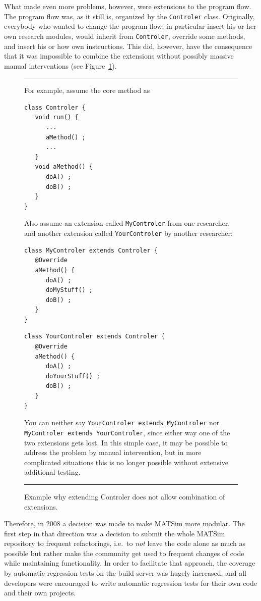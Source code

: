 What made even more problems, however, were extensions to the program flow.  The program flow was, as it still is, organized by the \lstinline$Controler$ class.  Originally, everybody who wanted to change the program flow, in particular insert his or her own research modules, would inherit from \lstinline$Controler$, override some methods, and insert his or how own instructions.  This did, however, have the consequence that it was impossible to combine the extensions without possibly massive manual interventions (see Figure~\ref{fig:do-not-extend-controler}).

\begin{figure}\footnotesize
\hrule
For example, assume the core method as
\begin{lstlisting}
class Controler {
   void run() {
      ...
      aMethod() ;
      ...
   }
   void aMethod() {
      doA() ;
      doB() ;
   }
}
\end{lstlisting}
Also assume an extension called \protect\lstinline$MyControler$
from one researcher, and another extension called \protect\lstinline$YourControler$ by another researcher:
\begin{lstlisting}
class MyControler extends Controler {
   @Override
   aMethod() {
      doA() ;
      doMyStuff() ;
      doB() ;
   }
}
\end{lstlisting}
\begin{lstlisting}
class YourControler extends Controler {
   @Override
   aMethod() {
      doA() ;
      doYourStuff() ;
      doB() ;
   }
}  
\end{lstlisting}
You can neither say \protect\lstinline$YourControler extends MyControler$ nor \protect\lstinline$MyControler extends YourControler$, since either way one of the two extensions gets lost.  In this simple case, it may be possible to address the problem by manual intervention, but in more complicated situations this is no longer possible without extensive additional testing.
\hrule
\caption{Example why extending Controler does not allow combination of extensions.}
\label{fig:do-not-extend-controler}
\end{figure}

Therefore, in 2008 a decision was made to make MATSim more modular.  The first step in that direction was a decision to submit the whole MATSim repository to frequent refactorings, i.e.\ to \emph{not} leave the code alone as much as possible but rather make the community get used to frequent changes of code while maintaining functionality.  In order to facilitate that approach, the coverage by automatic regression tests on the build server was hugely increased, and all developers were encouraged to write automatic regression tests for their own code and their own projects. 

